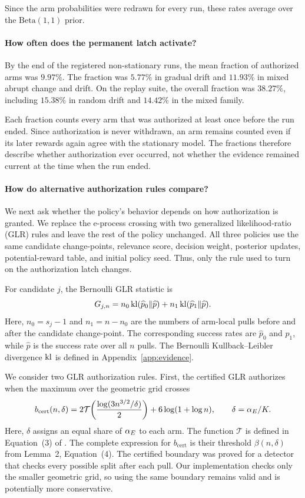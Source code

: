 Since the arm probabilities were redrawn for every run, these rates average
over the $\mathrm{Beta}(1,1)$ prior.

\paragraph{How often does the permanent latch activate?}
By the end of the registered non-stationary runs, the mean fraction of
authorized arms was $9.97\%$. The fraction was $5.77\%$ in gradual drift and
$11.93\%$ in mixed abrupt change and drift. On the replay suite, the overall
fraction was $38.27\%$, including $15.38\%$ in random drift and $14.42\%$ in
the mixed family.

Each fraction counts every arm that was authorized at least once before the
run ended.
Since authorization is never withdrawn, an arm remains counted
even if its later rewards again agree with the stationary model.
The fractions therefore describe whether authorization ever occurred, not whether the
evidence remained current at the time when the run ended.

\paragraph{How do alternative authorization rules compare?}
\label{app:glr-comparator}
We next ask whether the policy's behavior depends on how authorization is
granted.
We replace the e-process crossing with two generalized likelihood-ratio (GLR) rules and leave the rest of the policy unchanged.
All three policies use the same candidate change-points, relevance score,
decision weight, posterior updates, potential-reward table, and initial policy
seed.
Thus, only the rule used to turn on the authorization latch changes.

For candidate $j$, the Bernoulli GLR statistic is
\[
 G_{j,n}
 =
 n_0\operatorname{kl}(\widehat p_0\Vert\widehat p)
 +
 n_1\operatorname{kl}(\widehat p_1\Vert\widehat p).
\]
Here, $n_0=s_j-1$ and $n_1=n-n_0$ are the numbers of arm-local pulls
before and after the candidate change-point.
The corresponding success rates are $\widehat p_0$ and $\widehat p_1$,
while $\widehat p$ is the success rate over all $n$ pulls.
The Bernoulli Kullback--Leibler divergence $\operatorname{kl}$ is defined in
Appendix~\ref{app:evidence}.

We consider two GLR authorization rules.
First, the certified GLR authorizes when the maximum over the geometric grid
crosses
\[
 b_{\mathrm{cert}}(n,\delta)
 =
 2\mathcal T\!\left(
 \frac{\log(3n^{3/2}/\delta)}{2}
 \right)
 +6\log(1+\log n),
 \qquad
 \delta=\alpha_E/K.
\]
Here, $\delta$ assigns an equal share of $\alpha_E$ to each arm.
The function $\mathcal T$ is defined in Equation~(3) of
\citet{besson2022glr}.
The complete expression for $b_{\mathrm{cert}}$ is their threshold
$\beta(n,\delta)$ from Lemma~2, Equation~(4).
The certified boundary was proved for a detector that checks every possible
split after each pull.
Our implementation checks only the smaller geometric grid, so using the same boundary remains valid and is potentially more
conservative.

